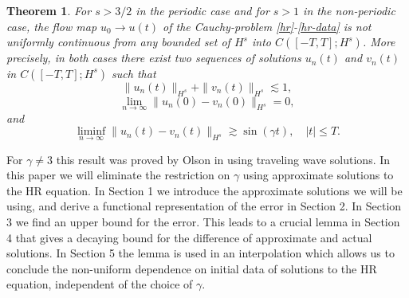\documentclass[12pt,reqno]{amsart}
\theoremstyle{plain}  %
\newtheorem{theorem}{Theorem}
\theoremstyle{definition}
\begin{document}
\begin{theorem}
	\label{hr-non-unif-dependence}
	For $s>3/2$ in the periodic case and for $s>1$ in
	the non-periodic case, the flow map $u_0 \to u(t)$ of the
	Cauchy-problem \eqref{hr}-\eqref{hr-data} is not uniformly continuous
	from any bounded set of $H^s$ into $C([-T, T]; H^s)$.
	More precisely, in both cases there exist two sequences of solutions $u_n(t)$
	and $v_n(t)$ in $C([-T, T]; H^s)$ such that
	\begin{equation}
		\label{h-s-bdd}
		\| u_n(t)  \|_{H^s}
		+
		\| v_n(t)  \|_{H^s}
		\lesssim
		1,
	\end{equation}
	\begin{equation}
		\label{zero-limit-at-0}
		\lim_{n\to\infty}
		\|
		u_n(0)
		-
		v_n(0)
		\|_{H^s}
		=
		0,
	\end{equation}
	and
	\begin{equation}
		\label{bdd-away-from-0}
		\liminf_{n\to\infty}
		\|
		u_n(t)
		-
		v_n(t)
	\|_{H^s}
		\gtrsim
		\sin ( \gamma t),
		\quad
		|t|\le T.
	\end{equation}
	\end{theorem}
	For $\gamma \neq 3$ this result was proved by Olson in \cite{o} using
	traveling wave solutions. In this paper
	we will eliminate the restriction on $\gamma$ using approximate solutions to the HR
	equation. In Section 1 we introduce the approximate
	solutions we will be using, and derive a functional representation of
	the error in Section 2. In Section 3 we find an upper bound for the
	error. This leads to a crucial lemma in Section 4 that gives a
	decaying bound for the difference of approximate and actual solutions.
	In Section 5 the lemma is used in an interpolation which allows us to 
	conclude the non-uniform dependence on initial
	data of solutions to the HR equation, independent of the choice of 
	$\gamma$.
\vskip0.1in
\end{document}
